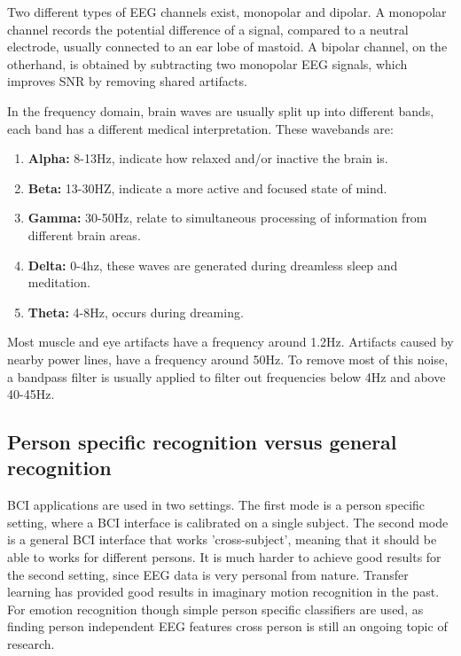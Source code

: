 
Two different types of EEG channels exist, monopolar and dipolar. A monopolar channel records the potential difference of a signal, compared to a neutral electrode, usually connected to an ear lobe of mastoid. A bipolar channel, on the otherhand, is obtained by subtracting two monopolar EEG signals, which improves SNR by removing shared artifacts\cite{MonoBiPolar}. 

\npar 

In the frequency domain, brain waves are usually split up into different bands\cite{EmotionRelativePower,WavesSite}, each band has a different medical interpretation. These wavebands \label{wavebands} are:
\begin{enumerate}
\item \textbf{Alpha:} 8-13Hz, indicate how relaxed and/or inactive the brain is.
\item \textbf{Beta:} 13-30HZ, indicate a more active and focused state of mind.
\item \textbf{Gamma:} 30-50Hz, relate to simultaneous processing of information from different brain areas.
\item \textbf{Delta:} 0-4hz, these waves are generated during dreamless sleep and meditation.
\item \textbf{Theta:} 4-8Hz, occurs during dreaming.
\end{enumerate}
Most muscle and eye artifacts have a frequency around 1.2Hz. Artifacts caused by nearby power lines, have a frequency around 50Hz\cite{ExtendedPaper}. To remove most of this noise, a bandpass filter is usually applied to filter out frequencies below 4Hz and above 40-45Hz.

\subsection{Person specific recognition versus general recognition}
BCI applications are used in two settings. The first mode is a person specific setting, where a BCI interface is calibrated on a single subject. The second mode is a general BCI interface that works 'cross-subject', meaning that it should be able to works for different persons. It is much harder to achieve good results for the second setting, since EEG data is very personal from nature\citep{DEAP}. Transfer learning has provided good results in imaginary motion recognition in the past. For emotion recognition though simple person specific classifiers are used, as finding person independent EEG features cross person is still an ongoing topic of research. %

